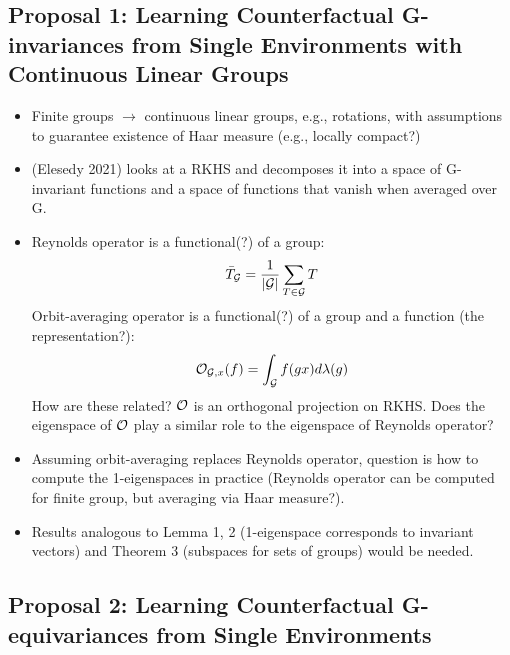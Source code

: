 \iffalse
\subsection{Proposal 1: Learning Counterfactual G-invariances from Single Environments with Continuous Linear Groups}

\begin{itemize}

\item
Finite groups $\rightarrow$ continuous linear groups, e.g., rotations, with assumptions to guarantee existence of Haar measure (e.g., locally compact?)

\item
(Elesedy 2021) looks at a RKHS and decomposes it into a space of G-invariant functions and a space of functions that vanish when averaged over G.

\item
Reynolds operator is a functional(?) of a group:
\[
\bar{T}_{\mathcal{G}} = \frac{1}{|\mathcal{G}|}\sum_{T\in\mathcal{G}}T
\]
Orbit-averaging operator is a functional(?) of a group and a function (the representation?):
\[
\mathcal{O}_{\mathcal{G},x}(f) = \int_{\mathcal{G}} f(gx)d\lambda(g)
\]
How are these related? $\mathcal{O}$ is an orthogonal projection on RKHS. Does the eigenspace of $\mathcal{O}$ play a similar role to the eigenspace of Reynolds operator?

\item
Assuming orbit-averaging replaces Reynolds operator, question is how to compute the 1-eigenspaces in practice (Reynolds operator can be computed for finite group, but averaging via Haar measure?).

\item
Results analogous to Lemma 1, 2 (1-eigenspace corresponds to invariant vectors) and Theorem 3 (subspaces for sets of groups) would be needed.

\end{itemize}


\subsection{Proposal 2: Learning Counterfactual G-equivariances from Single Environments}

